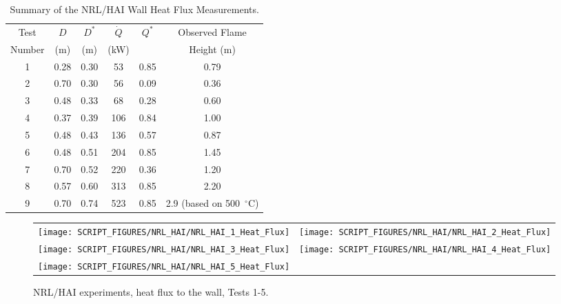 \begin{table}[ht]
\caption[Summary of the NRL/HAI Wall Heat Flux Measurements]{Summary of the NRL/HAI Wall Heat Flux Measurements.}
\begin{center}
\begin{tabular}{|c|c|c|c|c|c|}
\hline
Test     & $D$     & $D^*$      & $\dot{Q}$   & $Q^*$   & Observed  Flame \\
Number   & (m)     & (m)        & (kW)        &         & Height (m)      \\ \hline \hline
1        & 0.28    & 0.30       &  53         & 0.85    & 0.79            \\ \hline
2        & 0.70    & 0.30       &  56         & 0.09    & 0.36            \\ \hline
3        & 0.48    & 0.33       &  68         & 0.28    & 0.60            \\ \hline
4        & 0.37    & 0.39       &  106        & 0.84    & 1.00            \\ \hline
5        & 0.48    & 0.43       &  136        & 0.57    & 0.87            \\ \hline
6        & 0.48    & 0.51       &  204        & 0.85    & 1.45            \\ \hline
7        & 0.70    & 0.52       &  220        & 0.36    & 1.20            \\ \hline
8        & 0.57    & 0.60       &  313        & 0.85    & 2.20            \\ \hline
9        & 0.70    & 0.74       &  523        & 0.85    & 2.9 (based on 500~$^\circ$C)       \\ \hline
\end{tabular}
\end{center}
\label{NRL/HAI_Parameters}
\end{table}

\newpage

\begin{figure}[p]
\begin{tabular*}{\textwidth}{l@{\extracolsep{\fill}}r}
\texttt{[image: SCRIPT\_FIGURES/NRL\_HAI/NRL\_HAI\_1\_Heat\_Flux]} &
\texttt{[image: SCRIPT\_FIGURES/NRL\_HAI/NRL\_HAI\_2\_Heat\_Flux]} \\
\texttt{[image: SCRIPT\_FIGURES/NRL\_HAI/NRL\_HAI\_3\_Heat\_Flux]} &
\texttt{[image: SCRIPT\_FIGURES/NRL\_HAI/NRL\_HAI\_4\_Heat\_Flux]} \\
\texttt{[image: SCRIPT\_FIGURES/NRL\_HAI/NRL\_HAI\_5\_Heat\_Flux]} &
\end{tabular*}
\label{NRL_HAI_1}
\caption[NRL/HAI experiments, heat flux to the wall, Tests 1-5]{NRL/HAI experiments, heat flux to the wall, Tests 1-5.}
\end{figure}

